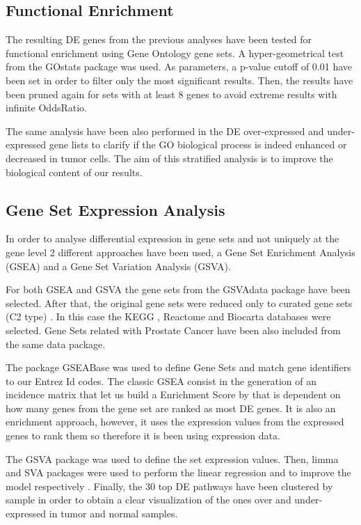 \documentclass[9pt,twocolumn,twoside]{gsajnl}
\begin{document}
\subsection*{Functional Enrichment}


The resulting DE genes from the previous analyses have been tested for functional enrichment using Gene Ontology gene sets. A hyper-geometrical test from the GOstats package \cite{GOstats} was used. As parameters, a p-value cutoff of 0.01 have been set in order to filter only the most significant results. Then, the results have been pruned again for sets with at least 8 genes to avoid extreme results with infinite OddsRatio.

The same analysis have been also performed in the DE over-expressed and under-expressed gene lists to clarify if the GO biological process is indeed enhanced or decreased in tumor cells. The aim of this stratified analysis is to improve the biological content of our results.


\subsection*{Gene Set Expression Analysis}
In order to analyse differential expression in gene sets and not uniquely at the gene level 2 different approaches have been used, a Gene Set Enrichment Analysis (GSEA) and a Gene Set Variation Analysis (GSVA).


For both GSEA and GSVA the gene sets from the GSVAdata package \cite{GSVAdata} have been selected. After that, the original gene sets were reduced only to curated gene sets  (C2 type) . In this case the KEGG  \cite{kanehisa2016kegg}, Reactome \cite{fabregat2016reactome} and   Biocarta \cite{nishimura2001biocarta} databases were selected. Gene Sets related with Prostate Cancer have been also included from the same data package.


The package GSEABase \cite{GSEABase} was used to define Gene Sets and match gene identifiers to our Entrez Id codes. The classic GSEA consist in the generation of an incidence matrix that let us build a Enrichment Score by that is dependent on how many genes from the gene set are ranked as most DE genes. It is also an enrichment approach, however, it uses the expression values from the expressed genes to rank them so therefore it is been using expression data.

The GSVA package \cite{GSVA} was used to define the set expression values. Then, limma  \cite{limma} and SVA packages were used to perform the linear regression and to improve the model respectively \cite{leek2007capturing,svamanual} . Finally, the 30 top DE pathways have been clustered by sample in order to obtain a clear visualization of the ones over and under-expressed in tumor and normal samples.
\end{document}
